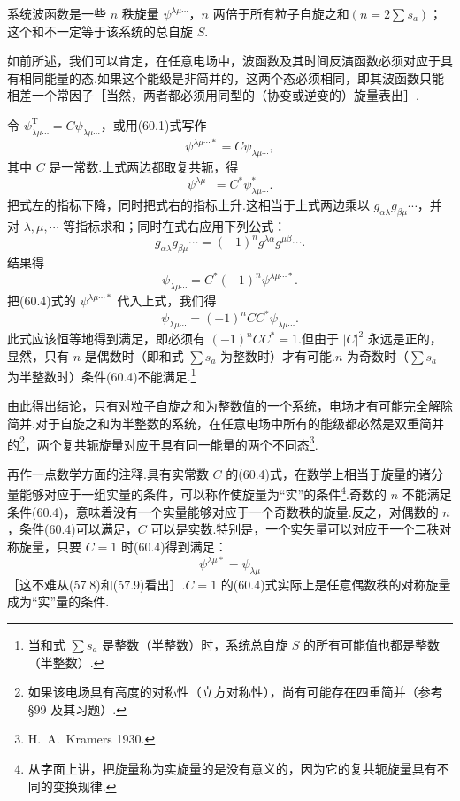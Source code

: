 系统波函数是一些 $n$ 秩旋量 $\psi^{\lambda\mu\cdots}$，$n$ 两倍于所有粒子自旋之和$\left(n=2\sum s_a\right)$；这个和不一定等于该系统的总自旋 $S$.

如前所述，我们可以肯定，在任意电场中，波函数及其时间反演函数必须对应于具有相同能量的态.如果这个能级是非简并的，这两个态必须相同，即其波函数只能相差一个常因子［当然，两者都必须用同型的（协变或逆变的）旋量表出］.

令 $\psi^{\mathrm{T}}_{\lambda\mu\cdots}=C\psi_{\lambda\mu\cdots}$，或用(60.1)式写作
\begin{equation}
  \psi^{\lambda\mu\cdots *}=C\psi_{\lambda\mu\cdots},
\end{equation}
其中 $C$ 是一常数.上式两边都取复共轭，得
\begin{equation*}
  \psi^{\lambda\mu\cdots}=C^*\psi^*_{\lambda\mu\cdots}.
\end{equation*}
把式左的指标下降，同时把式右的指标上升.这相当于上式两边乘以 $g_{\alpha\lambda}g_{\beta\mu}\cdots$，并对 $\lambda,\mu,\cdots$ 等指标求和；同时在式右应用下列公式：
\begin{equation*}
  g_{\alpha\lambda}g_{\beta\mu}\cdots=(-1)^n g^{\lambda\alpha}g^{\mu\beta}\cdots.
\end{equation*}
结果得
\begin{equation*}
  \psi_{\lambda\mu\cdots}=C^*(-1)^n\psi^{\lambda\mu\cdots *}.
\end{equation*}
把(60.4)式的 $\psi^{\lambda\mu\cdots *}$ 代入上式，我们得
\begin{equation*}
  \psi_{\lambda\mu\cdots}=(-1)^n CC^*\psi_{\lambda\mu\cdots}.
\end{equation*}
此式应该恒等地得到满足，即必须有 $(-1)^n CC^*=1$.但由于 $|C|^2$ 永远是正的，显然，只有 $n$ 是偶数时（即和式 $\sum s_a$ 为整数时）才有可能.$n$ 为奇数时（$\sum s_a$ 为半整数时）条件(60.4)不能满足.\footnote{当和式 $\sum s_a$ 是整数（半整数）时，系统总自旋 $S$ 的所有可能值也都是整数（半整数）.}

由此得出结论，只有对粒子自旋之和为整数值的一个系统，电场才有可能完全解除简并.对于自旋之和为半整数的系统，在任意电场中所有的能级都必然是双重简并的\footnote{如果该电场具有高度的对称性（立方对称性），尚有可能存在四重简并（参考§99 及其习题）.}，两个复共轭旋量对应于具有同一能量的两个不同态\footnote{H.~A.~Kramers 1930.}.

再作一点数学方面的注释.具有实常数 $C$ 的(60.4)式，在数学上相当于旋量的诸分量能够对应于一组实量的条件，可以称作使旋量为“实”的条件\footnote{从字面上讲，把旋量称为实旋量的是没有意义的，因为它的复共轭旋量具有不同的变换规律.}.奇数的 $n$ 不能满足条件(60.4)，意味着没有一个实量能够对应于一个奇数秩的旋量.反之，对偶数的 $n$，条件(60.4)可以满足，$C$ 可以是实数.特别是，一个实矢量可以对应于一个二秩对称旋量，只要 $C=1$ 时(60.4)得到满足：
\begin{equation*}
  \psi^{\lambda\mu *}=\psi_{\lambda\mu}
\end{equation*}
［这不难从(57.8)和(57.9)看出］.$C=1$ 的(60.4)式实际上是任意偶数秩的对称旋量成为“实”量的条件.
